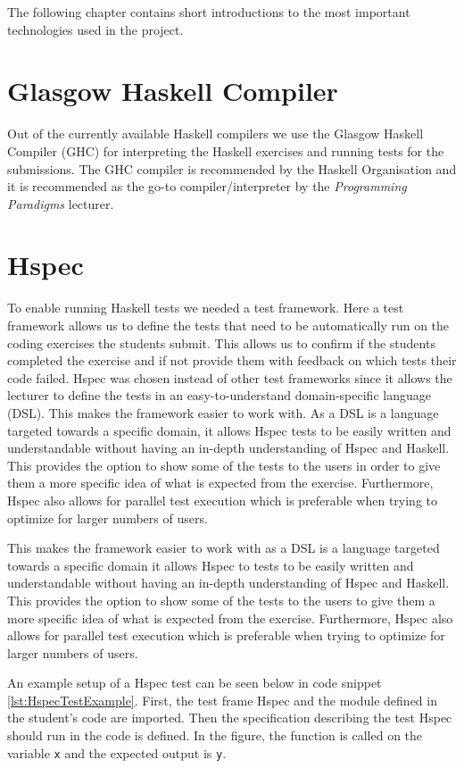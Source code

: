 The following chapter contains short introductions to the most important technologies used in the project.

\section*{Glasgow Haskell Compiler}
Out of the currently available Haskell compilers we use the Glasgow Haskell Compiler (GHC) for interpreting the Haskell exercises and running tests for the submissions. The GHC compiler is recommended by the Haskell Organisation and it is recommended as the go-to compiler/interpreter by the \textit{Programming Paradigms} lecturer\cite{Haskell_GHC}.


\section*{Hspec}
To enable running Haskell tests we needed a test framework. Here a test framework allows us to define the tests that need to be automatically run on the coding exercises the students submit. This allows us to confirm if the students completed the exercise and if not provide them with feedback on which tests their code failed.
Hspec was chosen instead of other test frameworks since it allows the lecturer to define the tests in an easy-to-understand domain-specific language (DSL).
This makes the framework easier to work with. As a DSL is a language targeted towards a specific domain, it allows Hspec tests to be easily written and understandable without having an in-depth understanding of Hspec and Haskell.
This provides the option to show some of the tests to the users in order to give them a more specific idea of what is expected from the exercise.
Furthermore, Hspec also allows for parallel test execution which is preferable when trying to optimize for larger numbers of users\cite{Hspec_landing}.

This makes the framework easier to work with as a DSL is a language targeted towards a specific domain it allows Hspec to tests to be easily written and understandable without having an in-depth understanding of Hspec and Haskell.
This provides the option to show some of the tests to the users to give them a more specific idea of what is expected from the exercise.
Furthermore, Hspec also allows for parallel test execution which is preferable when trying to optimize for larger numbers of users.

An example setup of a Hspec test can be seen below in code snippet \ref{lst:HspecTestExample}. First, the test frame Hspec and the module defined in the student's code are imported. Then the specification describing the test Hspec should run in the code is defined. In the figure, the function is called on the variable \texttt{x} and the expected output is \texttt{y}.


